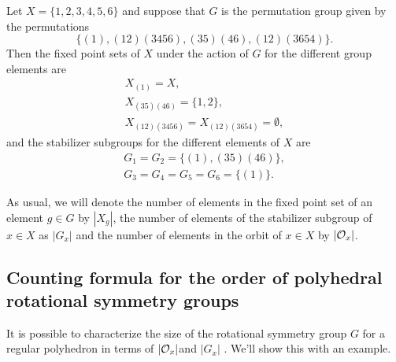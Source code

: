 \begin{example}\label{example:actions:FixedPoint3}
Let $X = \{1, 2, 3, 4, 5, 6\}$ and suppose that $G$ is the permutation
group given by the permutations 
$$\{(1), (1 2)(3 4 5 6), (3 5)(4 6), (1 2)( 3 6 5 4)\}.$$
Then the fixed point sets of $X$ under the action of $G$ for the different group elements are
$$
\begin{array}{c}
X_{(1)} = X, \\
X_{(3 5)(4 6)} = \{1,2\}, \\
X_{(1 2)(3 4 5 6)} = X_{(1 2)(3 6 5 4)} = \emptyset,
\end{array}
$$
and the stabilizer subgroups for the different elements of $X$ are
$$
\begin{array}{c}
G_1 = G_2 = \{(1), (3 5)(4 6) \}, \\
G_3 = G_4 = G_5 = G_6 = \{(1)\}.
\end{array}
$$
\end{example}

As usual, we will denote the number of elements in the fixed point set of an
element $g \in G$ by $|X_g|$, the number of elements of the stabilizer subgroup of $x\in X$ as $|G_x|$ and the number of elements in the orbit of $x \in X$ by $|{\cal O}_x|$. 

\subsection{Counting formula for the order of  polyhedral rotational symmetry groups}

It is possible to characterize the size of the rotational symmetry group $G$ for a regular polyhedron in terms of $|{\cal O}_x|$and $|G_x|$ . We'll show this with an example.

